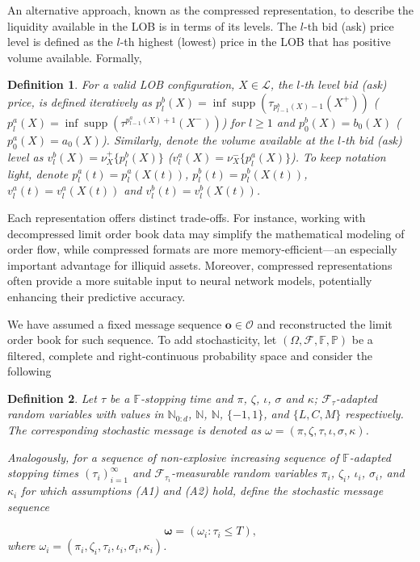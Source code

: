 \documentclass[10pt,a4paper,oneside]{article}
\newcommand{\N}{\mathbb{N}}
\newcommand{\Prob}{\mathbb{P}}
\newcommand{\Fil}{\mathbb{F}}
\newcommand{\SigAl}{\mathcal{F}}
\newtheorem{definition}{Definition}
\DeclareMathOperator{\support}{supp}
\begin{document}
An alternative approach, known as the compressed representation, to describe the liquidity available in the LOB is in terms of its levels. The $l$-th bid (ask) price level is defined as the $l$-th highest (lowest) price in the LOB that has positive volume available. Formally, 

\begin{definition}
    For a valid LOB configuration, $X \in \mathcal{L}$, the $l$-th level bid (ask) price, is defined iteratively as $p^b_l(X) = \inf \support\left(\tau_{p^b_{l - 1}(X) - 1}(X^+) \right)$ ($p^a_l(X) = \inf \support\left(\tau^{p^a_{l - 1}(X) + 1}(X^-) \right)$) for $l \geq 1$ and $p^b_0(X) = b_0(X)$ ($p^a_0(X) = a_0(X)$). Similarly, denote the volume available at the $l$-th bid (ask) level as $v^b_l(X) = \nu^+_{X}\{p^b_l(X)\}$ ($v^a_l(X) = \nu^-_{X}\{p^a_l(X)\}$). To keep notation light, denote $p^a_l(t) = p^a_l(X(t))$, $p^b_l(t) = p^b_l(X(t))$, $v^a_l(t) = v^a_l(X(t))$ and $v^b_l(t) = v^b_l(X(t))$.
    \label{def:bid_ask_volume_levels}
\end{definition}

Each representation offers distinct trade-offs. For instance, working with decompressed limit order book data may simplify the mathematical modeling of order flow, while compressed formats are more memory-efficient—an especially important advantage for illiquid assets. Moreover, compressed representations often provide a more suitable input to neural network models, potentially enhancing their predictive accuracy.


We have assumed a fixed message sequence $\mathbf{o} \in \mathcal{O}$ and reconstructed the limit order book for such sequence. To add stochasticity, let $(\Omega, \SigAl, \Fil, \Prob)$ be a filtered, complete and right-continuous probability space and consider the following 

\begin{definition}
Let $\tau$ be a $\Fil$-stopping time and $\pi$, $\zeta$, $\iota$, $\sigma$ and $\kappa$; $\SigAl_{\tau}$-adapted random variables with values in $\N_{0:d}$, $\N$, $\N$, $\{-1, 1\}$, and $\{L, C, M\}$ respectively. The corresponding stochastic message is denoted as  $\omega = (\pi, \zeta, \tau, \iota, \sigma, \kappa)$.

Analogously, for a sequence of non-explosive increasing sequence of $\Fil$-adapted stopping times $(\tau_i)^{\infty}_{i = 1}$ and $\SigAl_{\tau_i}$-measurable random variables $\pi_i$, $\zeta_i$, $\iota_i$, $\sigma_i$, and $\kappa_i$ for which assumptions (A1) and (A2) hold, define the stochastic message sequence

\begin{equation*}
\boldsymbol{\omega} = (\omega_i : \tau_i \leq T),
\end{equation*}
where $\omega_i = (\pi_i, \zeta_i, \tau_i, \iota_i, \sigma_i, \kappa_i)$. 
\label{def:stochastic_messages}
\end{definition}
\end{document}
